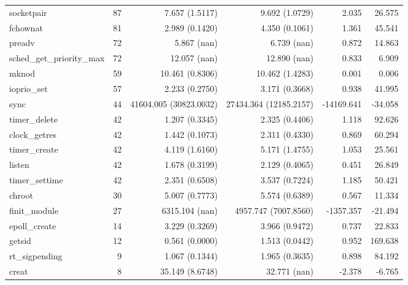 \begin{longtable}{>{\ttfamily}lrrrrr}
                     socketpair &         87 &              7.657 (1.5117) &            9.692 (1.0729) &           2.035 &       26.575 \\
                       fchownat &         81 &              2.989 (0.1420) &            4.350 (0.1061) &           1.361 &       45.541 \\
                         preadv &         72 &                 5.867 (nan) &               6.739 (nan) &           0.872 &       14.863 \\
      sched\_get\_priority\_max &         72 &                12.057 (nan) &              12.890 (nan) &           0.833 &        6.909 \\
                          mknod &         59 &             10.461 (0.8306) &           10.462 (1.4283) &           0.001 &        0.006 \\
                    ioprio\_set &         57 &              2.233 (0.2750) &            3.171 (0.3668) &           0.938 &       41.995 \\
                           sync &         44 &      41604.005 (30823.0032) &    27434.364 (12185.2157) &      -14169.641 &      -34.058 \\
                  timer\_delete &         42 &              1.207 (0.3345) &            2.325 (0.4406) &           1.118 &       92.626 \\
                  clock\_getres &         42 &              1.442 (0.1073) &            2.311 (0.4330) &           0.869 &       60.294 \\
                  timer\_create &         42 &              4.119 (1.6160) &            5.171 (1.4755) &           1.053 &       25.561 \\
                         listen &         42 &              1.678 (0.3199) &            2.129 (0.4065) &           0.451 &       26.849 \\
                 timer\_settime &         42 &              2.351 (0.6508) &            3.537 (0.7224) &           1.185 &       50.421 \\
                         chroot &         30 &              5.007 (0.7773) &            5.574 (0.6389) &           0.567 &       11.334 \\
                  finit\_module &         27 &              6315.104 (nan) &      4957.747 (7007.8560) &       -1357.357 &      -21.494 \\
                  epoll\_create &         14 &              3.229 (0.3269) &            3.966 (0.9472) &           0.737 &       22.833 \\
                         getsid &         12 &              0.561 (0.0000) &            1.513 (0.0442) &           0.952 &      169.638 \\
                 rt\_sigpending &          9 &              1.067 (0.1344) &            1.965 (0.3635) &           0.898 &       84.192 \\
                          creat &          8 &             35.149 (8.6748) &              32.771 (nan) &          -2.378 &       -6.765 \\
\end{longtable}
